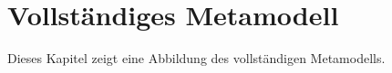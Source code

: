 
\appendix
\chapter{Vollständiges Metamodell}
\label{chapter:appendix-metamodel}

Dieses Kapitel zeigt eine Abbildung des vollständigen Metamodells.
